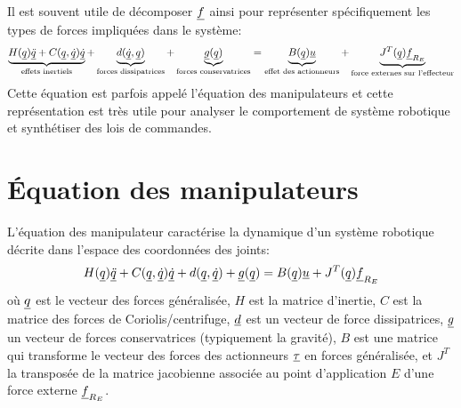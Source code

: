 Il est souvent utile de décomposer $\underline{f}$ ainsi pour représenter spécifiquement les types de forces impliquées dans le système:
%
\begin{align}
\underbrace{
H(\underline{q}) \underline{\ddot{q}} + C(\underline{q},\underline{\dot{q}}) \underline{\dot{q}} 
}_{\text{effets inertiels}}
+ 
\underbrace{
d(\underline{\dot{q}},\underline{q}) 
}_{\text{forces dissipatrices}}
+ 
\underbrace{
\underline{g}(\underline{q}) 
}_{\text{forces conservatrices}}
= 
\underbrace{
B(\underline{q}) \underline{u} 
}_{\text{effet des actionneurs}}
+
\underbrace{
J^T(\underline{q}) \underline{f}_{R_E}
}_{\text{force externes sur l'effecteur}}
\label{eq:manipulator}
\end{align}
%
Cette équation est parfois appelé l'équation des manipulateurs et cette représentation est très utile pour analyser le comportement de système robotique et synthétiser des lois de commandes.



\section{Équation des manipulateurs}
\label{sec:manipeq}

L'équation des manipulateur caractérise la dynamique d'un système robotique décrite dans l'espace des coordonnées des joints:
%
\begin{align}
H(\underline{q}) \underline{\ddot{q}} + C(\underline{q},\underline{\dot{q}}) \underline{\dot{q}} + d(\underline{q}, \underline{\dot{q}}) + \underline{g}(\underline{q}) = B(\underline{q}) \underline{u}  + J^T(\underline{q}) \underline{f}_{R_E}
\label{eq:manipulator}
\end{align}
%
où $\underline{q}$ est le vecteur des forces généralisée, $H$ est la matrice d'inertie, $C$ est la matrice des forces de Coriolis/centrifuge, $\underline{d}$ est un vecteur de force dissipatrices, $\underline{g}$ un vecteur de forces conservatrices (typiquement la gravité), $B$ est une matrice qui transforme le vecteur des forces des actionneurs $\underline{\tau}$ en forces généralisée, et $J^T$ la transposée de la matrice jacobienne associée au point d'application $E$ d'une force externe $\underline{f}_{R_E}$.

